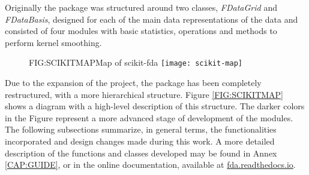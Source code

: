 
Originally the package was structured around two classes, \textit{FDataGrid} and
\textit{FDataBasis}, designed for each of the main data representations of the data and
consisted of four modules with basic statistics, operations and methods to
perform kernel smoothing.

\begin{figure}[Map of scikit-fda]{FIG:SCIKITMAP}{Map of scikit-fda \cite{ramos-carrenoScikitfdaPythonPackage2019}}
	\texttt{[image: scikit-map]}
\end{figure}


Due to the expansion of the project, the package has been completely
restructured, with a more hierarchical structure. Figure \ref{FIG:SCIKITMAP}
shows a diagram with a high-level description of this structure. The darker colors in the Figure represent a more advanced stage of development of the modules.
The following
subsections summarize, in general terms, the functionalities incorporated and
design changes made during this work. A more detailed description of the functions and classes developed may be found
in Annex \ref{CAP:GUIDE}, or in the online documentation, available at \href{https://fda.readthedocs.io/}{fda.readthedocs.io}.
